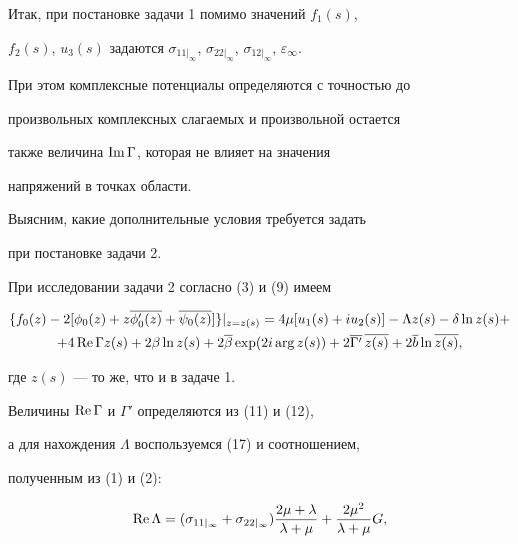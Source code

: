 Итак, при постановке задачи 1 помимо значений $f_1(s)$,


$f_2(s)$, $u_3(s)$ задаются $\sigma_{11 |_{\infty}}$, $\sigma_{22


|_{\infty}}$, $\sigma_{12 |_{\infty}}$, $\varepsilon_{\infty}$.


При этом комплексные потенциалы определяются с точностью до


произвольных комплексных слагаемых и произвольной остается


также величина $\operatorname{Im} \Gamma$, которая не влияет на значения


напряжений в точках области.





Выясним, какие дополнительные условия требуется задать


при постановке задачи 2.





При исследовании задачи 2 согласно (3) и (9) имеем


\begin{gather}


\{f_0(z) - 2[\phi_0(z) + z \overline{\phi_0'(z)} +


\overline{\psi_0(z)}]\}|_{z=z(s)} = 4\mu [u_1(s) + i u_2(s)] -


\Lambda z(s) - \delta \ln z(s) + \notag \\


%


+ 4 \re \Gamma z(s) + 2 \beta \ln z(s) + 2\overline{\beta}


\exp(2i\arg z(s)) + 2 \overline{\Gamma'}\, \overline{z(s)} + 2


\overline{b} \ln \overline{z(s)},


\end{gather}


где $z(s)$ --- то же, что и в задаче 1.





Величины $\operatorname{Re} \Gamma$ и $\Gamma'$ определяются из (11) и (12),


а для нахождения $\Lambda$ воспользуемся (17) и соотношением,


полученным из (1) и (2):


\begin{equation}


\re \Lambda = (\sigma_{11 |_{\infty}} + \sigma_{22


|_{\infty}}) \frac{2\mu + \lambda}{\lambda + \mu} +


\frac{2\mu^2}{\lambda + \mu} G, 


\end{equation}


